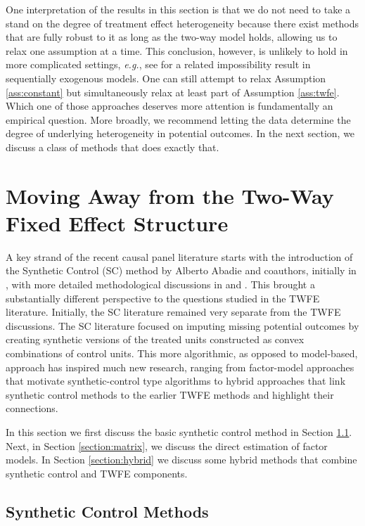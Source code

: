 \documentclass[letterpaper,12pt,leqno]{article}
\begin{document}
One interpretation of the results in this section is that we do not need to take a stand on the degree of treatment effect heterogeneity because there exist methods that are fully robust to it as long as the two-way model holds, allowing us to relax one assumption at a time. This conclusion, however, is unlikely to hold in more complicated settings, \textit{e.g.}, see \cite{arellano2001panel} for a related impossibility result in sequentially exogenous models. One can still attempt to relax Assumption \ref{ass:constant} but simultaneously relax at least part of  Assumption \ref{ass:twfe}. Which one of those approaches deserves more attention is fundamentally an empirical question.  More broadly, we recommend letting the data determine 
 the degree of underlying heterogeneity in potential outcomes. In the next section, we discuss a class of methods that does exactly that.  

\section{Moving Away from the Two-Way Fixed Effect Structure}\label{section:relax}
A key strand of the recent causal panel literature starts with the introduction of the Synthetic Control (SC) method by Alberto Abadie and coauthors, initially in    \citep{abadie2003}, with more detailed methodological discussions in  \citep*{abadie2010synthetic} and \citep{abadie2014}. This brought a substantially different perspective to the questions studied in the TWFE literature. Initially, the SC literature remained very separate from the  TWFE discussions. The SC literature focused on imputing missing potential outcomes by creating synthetic versions of the treated units constructed as convex combinations of control units. This more algorithmic, as opposed to model-based, approach has inspired much new research, ranging from factor-model approaches that motivate synthetic-control type algorithms to hybrid approaches that link synthetic control methods to the earlier TWFE methods and highlight their connections.

In this section we first discuss the basic synthetic control method in Section \ref{section:synth_basics}. Next, in Section \ref{section:matrix}, we discuss the direct estimation of factor models. In Section \ref{section:hybrid} we discuss some hybrid methods that combine synthetic control and TWFE components.




\subsection{Synthetic Control Methods}\label{section:synth_basics}
\end{document}
